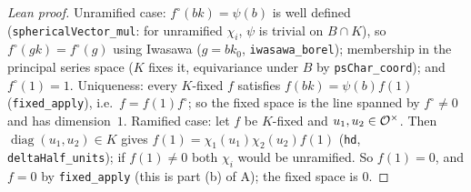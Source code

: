 \begin{proof}[Lean proof]
Unramified case: $f^\circ(bk)=\psi(b)$ is well defined (\texttt{sphericalVector\_mul}: for unramified $\chi_i$, $\psi$ is trivial on $B\cap K$), so $f^\circ(gk)=f^\circ(g)$ using Iwasawa ($g=bk_0$, \texttt{iwasawa\_borel}); membership in the principal series space ($K$ fixes it, equivariance under $B$ by \texttt{psChar\_coord}); and $f^\circ(1)=1$. Uniqueness: every $K$-fixed $f$ satisfies $f(bk)=\psi(b)f(1)$ (\texttt{fixed\_apply}), i.e.\ $f=f(1)f^\circ$; so the fixed space is the line spanned by $f^\circ\ne0$ and has dimension~$1$. Ramified case: let $f$ be $K$-fixed and $u_1,u_2\in\mathcal{O}^\times$. Then $\operatorname{diag}(u_1,u_2)\in K$ gives $f(1)=\chi_1(u_1)\chi_2(u_2)f(1)$ (\texttt{hd}, \texttt{deltaHalf\_units}); if $f(1)\ne0$ both $\chi_i$ would be unramified. So $f(1)=0$, and $f=0$ by \texttt{fixed\_apply} (this is part (b) of A); the fixed space is $0$.
\end{proof}

